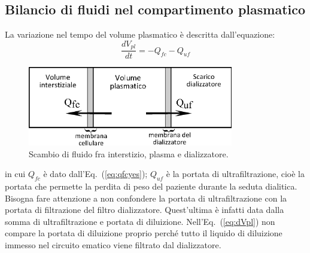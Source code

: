 \subsection{Bilancio di fluidi nel compartimento plasmatico}
La variazione nel tempo del volume plasmatico è descritta dall'equazione:
\begin{equation}\label{eq:dVpl}
	\frac{dV_{pl}}{dt} = -Q_{fc} - Q_{uf}
\end{equation}
\begin{figure}[htb]
	\centering
		\includegraphics[width=0.8\textwidth]{immagini/vol_dia.eps}
				\caption{Scambio di fluido fra interstizio, plasma e dializzatore.}
\end{figure}
in cui $Q_{fc}$ è dato dall'Eq.~(\ref{eq:qfcyes}); $Q_{uf}$ è la portata di ultrafiltrazione, cioè la portata che permette la perdita di peso del paziente durante la seduta dialitica. Bisogna fare attenzione a non confondere la portata di ultrafiltrazione con la portata di filtrazione del filtro dializzatore. Quest'ultima è infatti data dalla somma di ultrafiltrazione e portata di diluizione. Nell'Eq.~(\ref{eq:dVpl}) non compare la portata di diluizione proprio perché tutto il liquido di diluizione immesso nel circuito ematico viene filtrato dal dializzatore.
